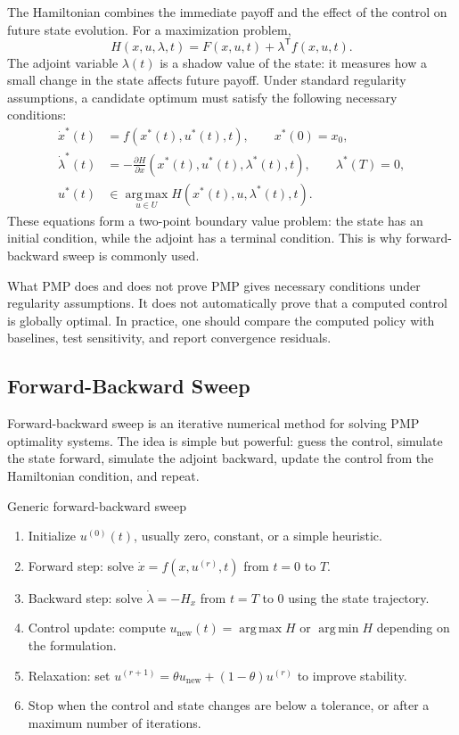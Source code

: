 \documentclass[11pt,a4paper]{article}
\newcommand{\argmax}{\operatorname*{arg\,max}}
\newcommand{\argmin}{\operatorname*{arg\,min}}
\newcommand{\T}{\mathsf{T}}
\begin{document}
The Hamiltonian combines the immediate payoff and the effect of the control on future state evolution. For a maximization problem,
\begin{equation}
  H(x,u,\lambda,t)=F(x,u,t)+\lambda^{\T}f(x,u,t).
  \label{eq:oc-hamiltonian}
\end{equation}
The adjoint variable $\lambda(t)$ is a shadow value of the state: it measures how a small change in the state affects future payoff. Under standard regularity assumptions, a candidate optimum must satisfy the following necessary conditions:
\begin{align}
  \dot{x}^*(t)&=f(x^*(t),u^*(t),t), \qquad x^*(0)=x_0, \label{eq:oc-pmp-state}\\
  \dot{\lambda}^*(t)&=-\frac{\partial H}{\partial x}(x^*(t),u^*(t),\lambda^*(t),t), \qquad \lambda^*(T)=0, \label{eq:oc-pmp-adjoint}\\
  u^*(t)&\in\argmax_{u\in U}H(x^*(t),u,\lambda^*(t),t). \label{eq:oc-pmp-control}
\end{align}
These equations form a two-point boundary value problem: the state has an initial condition, while the adjoint has a terminal condition. This is why forward-backward sweep is commonly used.

\begin{cautionbox}{What PMP does and does not prove}
PMP gives necessary conditions under regularity assumptions. It does not automatically prove that a computed control is globally optimal. In practice, one should compare the computed policy with baselines, test sensitivity, and report convergence residuals.
\end{cautionbox}

\subsection{Forward-Backward Sweep}

Forward-backward sweep is an iterative numerical method for solving PMP optimality systems. The idea is simple but powerful: guess the control, simulate the state forward, simulate the adjoint backward, update the control from the Hamiltonian condition, and repeat.

\begin{examplebox}{Generic forward-backward sweep}
\begin{enumerate}
  \item Initialize $u^{(0)}(t)$, usually zero, constant, or a simple heuristic.
  \item Forward step: solve $\dot{x}=f(x,u^{(r)},t)$ from $t=0$ to $T$.
  \item Backward step: solve $\dot{\lambda}=-H_x$ from $t=T$ to $0$ using the state trajectory.
  \item Control update: compute $u_{\mathrm{new}}(t)=\argmax H$ or $\argmin H$ depending on the formulation.
  \item Relaxation: set $u^{(r+1)}=\theta u_{\mathrm{new}}+(1-\theta)u^{(r)}$ to improve stability.
  \item Stop when the control and state changes are below a tolerance, or after a maximum number of iterations.
\end{enumerate}
\end{examplebox}
\end{document}
